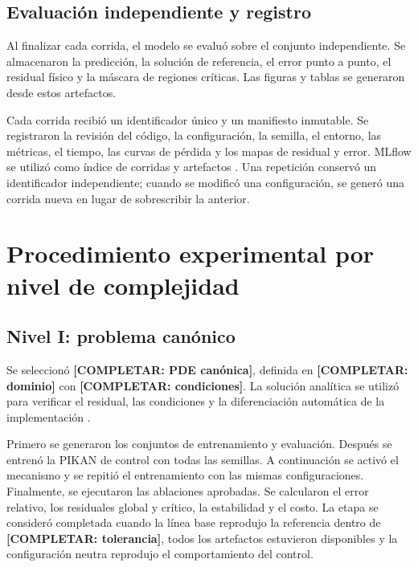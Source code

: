 \subsection{Evaluación independiente y registro}

Al finalizar cada corrida, el modelo se evaluó sobre el conjunto independiente. Se almacenaron la predicción, la solución de referencia, el error punto a punto, el residual físico y la máscara de regiones críticas. Las figuras y tablas se generaron desde estos artefactos.

Cada corrida recibió un identificador único y un manifiesto inmutable. Se registraron la revisión del código, la configuración, la semilla, el entorno, las métricas, el tiempo, las curvas de pérdida y los mapas de residual y error. MLflow se utilizó como índice de corridas y artefactos \cite{zaharia2018mlflow}. Una repetición conservó un identificador independiente; cuando se modificó una configuración, se generó una corrida nueva en lugar de sobrescribir la anterior.

\section{Procedimiento experimental por nivel de complejidad}
\label{subsec:procedimiento-dominios}

\subsection{Nivel I: problema canónico}

Se seleccionó \textbf{[COMPLETAR: PDE canónica]}, definida en \textbf{[COMPLETAR: dominio]} con \textbf{[COMPLETAR: condiciones]}. La solución analítica se utilizó para verificar el residual, las condiciones y la diferenciación automática de la implementación \cite{lagaris1998,raissi2019,grossmann2024}.

Primero se generaron los conjuntos de entrenamiento y evaluación. Después se entrenó la PIKAN de control con todas las semillas. A continuación se activó el mecanismo y se repitió el entrenamiento con las mismas configuraciones. Finalmente, se ejecutaron las ablaciones aprobadas. Se calcularon el error relativo, los residuales global y crítico, la estabilidad y el costo. La etapa se consideró completada cuando la línea base reprodujo la referencia dentro de \textbf{[COMPLETAR: tolerancia]}, todos los artefactos estuvieron disponibles y la configuración neutra reprodujo el comportamiento del control.

